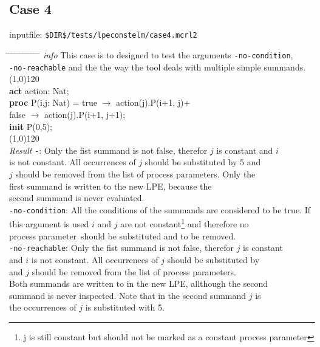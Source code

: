 \index{}\documentclass[a4paper,10pt]{article}
\theoremstyle{plain}
\theoremstyle{definition}
\newcommand{\pp}{process parameter}
\newcommand{\pps}{process parameters}
\newcommand{\ti}{\textit}
\newcommand{\tb}{\textbf}
\newcommand{\tabw}{\hspace*{15.mm} \= \hspace*{20.mm} \= \hspace*{5.mm} \= \hspace*{5.mm} \= \hspace*{5.mm} \= \hspace*{5.mm}  \= \hspace*{5.mm}  \= \hspace*{5.mm}  \= \hspace*{5.mm} \= \hspace*{5.mm} \= \hspace*{5.mm}  \= \hspace*{5.mm}  \= \hspace*{5.mm}\kill}
\begin{document}
\subsection*{Case 4}
inputfile: \verb"$DIR$/tests/lpeconstelm/case4.mcrl2"
\begin{tabbing}
\tabw
\ti{info} \> This case is to designed to test the arguments \verb"-no-condition", \\
\> \verb"-no-reachable" and the the way the tool deals with multiple simple summands. \\
\line(1,0){120}\\
\tb{act}  \> action: Nat;\\
\tb{proc} \> P(i,j: Nat) \> = \> true  $\rightarrow$ action(j).P(i+1, j)+\\
          \>             \>   \> false $\rightarrow$ action(j).P(i+1, j+1);\\
\tb{init} \> P(0,5);\\
\line(1,0){120}\\
\ti{Result} 
\> \verb"-": \> \> Only the fist summand is not false, therefor $j$ is constant and $i$ \\
\> \> \> is not constant. All occurrences of $j$ should be substituted by 5 and \\
\> \> \> $j$ should be removed from the list of \pps. Only the \\
\> \> \> first summand is written to the new LPE, because the \\
\> \> \> second summand is never evaluated.\\
\> \verb"-no-condition": \> \> All the conditions of the summands are considered to be true. If \\
\> \> \> this argument is used $i$ and $j$ are not constant\footnote{j is still constant but should not be marked as a constant \pp } and therefore no \\
\> \> \> \pp\ should be substituted and to be removed.\\
\> \verb"-no-reachable": \> \> Only the fist summand is not false, therefor $j$ is constant \\
\> \> \> and $i$ is not constant. All occurrences of $j$ should be substituted by \\
\> \>  and $j$ should be removed from the list of \pps. \\
\> \> \> Both summands are written to in the new LPE, allthough the second \\
\> \> \> summand is never inspected. Note that in the second summand $j$ is \\
\> \> \> the occurrences of $j$ is substituted with 5.\\
\end{tabbing}
\end{document}
